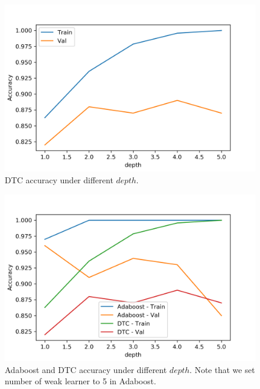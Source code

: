 \documentclass[journal, a4paper]{IEEEtran}
\begin{document}
\begin{figure}[!hbt]
	\begin{center}
		\includegraphics[width=\columnwidth]{d_weak_acc}
		\caption{DTC accuracy under different $depth$.}
		\label{fig:d_weak_acc}
	\end{center}
\end{figure} \par

\begin{figure}[!hbt]
	\begin{center}
		\includegraphics[width=\columnwidth]{d_acc}
		\caption{Adaboost and DTC accuracy under different $depth$. Note that we set number of weak learner to 5 in Adaboost.}
		\label{fig:d_acc}
	\end{center}
\end{figure} \par
\end{document}
